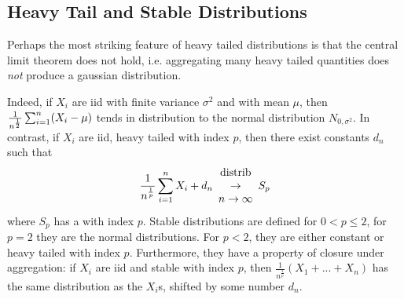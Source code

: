 %
\begin{figure}[htbp]
\end{figure}
%
\subsection{Heavy Tail and Stable Distributions}
Perhaps the most striking feature of heavy tailed
distributions is that the central limit theorem
does not hold, i.e. aggregating many heavy tailed
quantities does \emph{not} produce a gaussian
distribution.

Indeed, if $X_i$ are iid with finite variance
$\sigma^2$ and with mean $\mu$, then
$\frac{1}{n^{1 \over 2}}\sum_{i=1}^n(X_i -\mu)$
tends in distribution to the normal distribution
$N_{0,\sigma^2}$. In contrast, if $X_i$ are iid,
heavy tailed with index $p$, then there exist
constants $d_n$ such that
$$
\frac{1}{n^{1 \over p}}\sum_{i=1}^n X_i + d_n
\begin{array}{c}
 \mbox{distrib}\\
 {\large \rightarrow}\\
 n\rightarrow \infty
\end{array}
S_p
$$
where $S_p$ has a 
\label{def-stable}with index $p$. Stable
distributions are defined for $0<p\leq 2$, for
$p=2$ they are the normal distributions. For
$p<2$, they are either constant or heavy tailed
with index $p$. Furthermore, they have a property
of closure under aggregation: if $X_i$ are iid
and stable with index $p$, then
$\frac{1}{n^{\frac{1}{p}}}(X_1 +...+X_n)$ has the
same distribution as the $X_i$s, shifted by some
number $d_n$.

